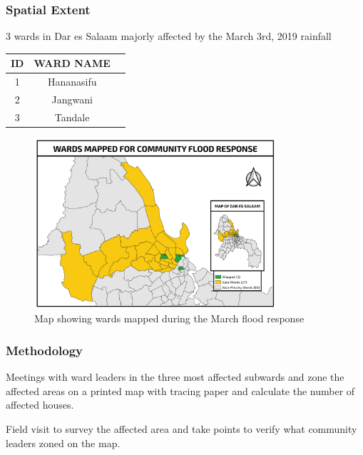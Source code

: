 \documentclass[a4paper,12pt,twoside]{article}
\begin{document}
\subsubsection{Spatial Extent}
3 wards in Dar es Salaam majorly affected by the March 3rd, 2019 rainfall

\begin{center}
\begin{tabular}{|c|c|c|}
\hline
ID & WARD NAME\\
\hline
1 & Hananasifu\\
\hline
2 & Jangwani\\
\hline
3 & Tandale\\
\hline
\end{tabular}
\end{center}

\begin{figure}[h]
  \color{RHgreen}\caption{Map showing wards mapped during the March flood response}
  \centering
 \includegraphics[width=0.8\textwidth]{images/flood_response.png}
\end{figure}

\subsubsection{Methodology}
Meetings with ward leaders in the three most affected subwards and zone the affected areas on a printed map with tracing paper and calculate the number of affected houses.

Field visit to survey the affected area and take points to verify what community leaders zoned on the map.
\end{document}

